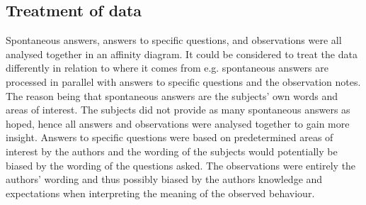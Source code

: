 \subsection{Treatment of data}
Spontaneous answers, answers to specific questions, and observations were all analysed together in an affinity diagram. It could be considered to treat the data differently in relation to where it comes from e.g. spontaneous answers are processed in parallel with answers to specific questions and the observation notes. The reason being that spontaneous answers are the subjects' own words and areas of interest. The subjects did not provide as many spontaneous answers as hoped, hence all answers and observations were analysed together to gain more insight. Answers to specific questions were based on predetermined areas of interest by the authors and the wording of the subjects would potentially be biased by the wording of the questions asked. The observations were entirely the authors' wording and thus possibly biased by the authors knowledge and expectations when interpreting the meaning of the observed behaviour.